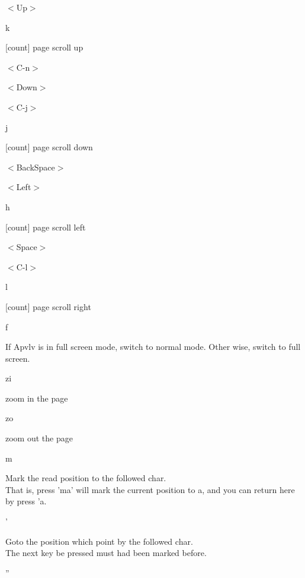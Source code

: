 \documentclass[a4paper,12pt]{article}
\begin{document}
\begin{description}
\item $<$Up$>$

\item k

[count] page scroll up

\item $<$C-n$>$

\item $<$Down$>$

\item $<$C-j$>$

\item j

[count] page scroll down

\item $<$BackSpace$>$

\item $<$Left$>$

\item h

[count] page scroll left

\item $<$Space$>$

\item $<$C-l$>$

\item l

[count] page scroll right

\item f

If Apvlv is in full screen mode, switch to normal mode. Other wise, switch to full screen.

\item zi

zoom in the page

\item zo

zoom out the page

\item m

Mark the read position to the followed char. \\
That is, press 'ma' will mark the current position to a, and you can return here by press 'a.

\item '

Goto the position which point by the followed char. \\
The next key be pressed must had been marked before. 

\item ''


\end{description}
\end{document}
